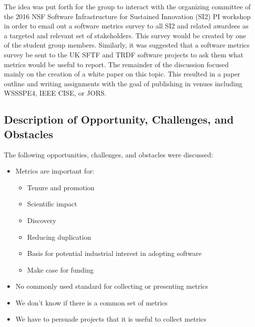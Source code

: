 \smallskip
\noindent
The idea was put forth for the group to interact with the organizing committee
of the 2016 NSF Software Infrastructure for Sustained Innovation (SI2) PI
workshop in order to email out a software metrics survey to all SI2 and related
awardees as a targeted and relevant set of stakeholders. This survey would be
created by one of the student group members. Similarly, it was suggested that a
software metrics survey be sent to the UK SFTF and TRDF software projects to ask
them what metrics would be useful to report. The remainder of the discussion
focused mainly on the creation of a white paper on this topic. This resulted in
a paper outline and writing assignments with the goal of publishing in venues
including WSSSPE4, IEEE CISE, or JORS.



\subsection{Description of Opportunity, Challenges, and Obstacles}

The following opportunities, challenges, and obstacles were discussed:

\begin{itemize}
\item
Metrics are important for:

\begin{itemize}
\item
        Tenure and promotion

\item
        Scientific impact

\item
        Discovery

\item
        Reducing duplication

\item
        Basis for potential industrial interest in adopting software

\item
        Make case for funding
\end{itemize}

\item
No commonly used standard for collecting or presenting metrics

\item
We don't know if there is a common set of metrics

\item
We have to persuade projects that it is useful to collect metrics

\end{itemize}



